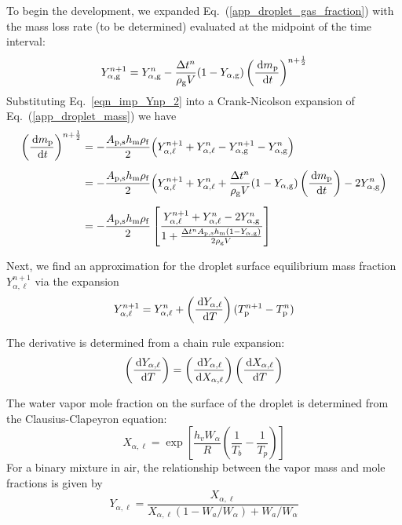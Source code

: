To begin the development, we expanded Eq.~(\ref{app_droplet_gas_fraction}) with the mass loss rate (to be determined) evaluated at the midpoint of the time interval:
\begin{equation}
\label{eqn_imp_Ynp_2}
Y_{\rm \alpha, g}^{n+1}=Y_{\rm \alpha, g}^n-\frac{\Delta t^n}{\rho_{\rm g} V} (1-Y_{\rm \alpha, g}) \left(\frac{\,\mathrm{d} m_{\rm p}}{\,\mathrm{d} t}\right)^{n+\frac{1}{2}}
\end{equation}
Substituting Eq.~\ref{eqn_imp_Ynp_2} into a Crank-Nicolson expansion of Eq.~(\ref{app_droplet_mass}) we have
\begin{align}
\label{eqn_imp_dmdt_2}
\left(\frac{\,\mathrm{d} m_{\rm p}}{\,\mathrm{d} t} \right)^{n+\frac{1}{2}} &= -\frac{A_{\rm p,s} h_{\rm m}\rho_{\rm f}}{2} \Big(Y_{\alpha,\ell}^{n+1}+Y_{\alpha,\ell}^n-Y_{\rm \alpha, g}^{n+1}-Y_{\rm \alpha, g}^n \Big) \notag \\[.5em]
&= -\frac{A_{\rm p,s} h_{\rm m} \rho_{\rm f}}{2} \Big(Y_{\alpha,\ell}^{n+1}+Y_{\alpha,\ell}^n+\frac{\Delta t^n}{\rho_{\rm g} V} (1-Y_{\rm \alpha, g}) \left(\frac{\,\mathrm{d} m_{\rm p}}{\,\mathrm{d} t}\right)-2Y_{\rm \alpha, g}^n \Big) \notag \\[.5em]
&=-\frac{A_{\rm p,s} h_{\rm m} \rho_{\rm f}}{2} \left[\frac{Y^{n+1}_{\alpha,\ell}+Y^n_{\alpha,\ell}-2Y^n_{\rm \alpha, g}}{1+\frac{\Delta t^n A_{\rm p,s} h_{\rm m}(1-Y_{\rm \alpha, g})}{2 \rho_{\rm g} V}}\right]
\end{align}

Next, we find an approximation for the droplet surface equilibrium mass fraction $Y_{\alpha,\ell}^{n+1}$ via the expansion
\begin{equation}
\label{eqn_Yl_expansion}
Y_{\alpha,\ell}^{n+1} = Y_{\alpha,\ell}^n + \left(\frac{\,\mathrm{d} Y_{\alpha,\ell}}{\,\mathrm{d} T}\right) (T_{\rm p}^{n+1} - T_{\rm p}^n)
\end{equation}

The derivative is determined from a chain rule expansion:
\begin{equation}
\label{eqn_dYldY_chainrule}
\left(\frac{\,\mathrm{d} Y_{\alpha,\ell}}{\,\mathrm{d} T}\right) = \left(\frac{\,\mathrm{d} Y_{\alpha,\ell}}{\,\mathrm{d} X_{\alpha,\ell}}\right) \left(\frac{\,\mathrm{d} X_{\alpha,\ell}}{\,\mathrm{d} T}\right)
\end{equation}

The water vapor mole fraction on the surface of the droplet is determined from the Clausius-Clapeyron equation:
\begin{equation}
\label{app_Clausius_Clapeyron}
X_{\alpha,\ell} = \exp \left[ \frac{h_v W_{\alpha}}{R} \left(\frac{1}{T_b} - \frac{1}{T_p}\right) \right]
\end{equation}
For a binary mixture in air, the relationship between the vapor mass and mole fractions is given by
\begin{equation}
\label{eqn_YX}
Y_{\alpha,\ell} = \frac{X_{\alpha,\ell}}{X_{\alpha,\ell}(1-W_a/W_{\alpha}) + W_a/W_{\alpha}}
\end{equation}

